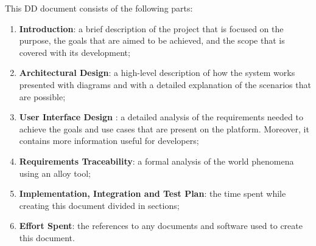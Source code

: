 \renewcommand{\arraystretch}{1.6}
This DD document consists of the following parts:
\begin{enumerate}
    \item \textbf{Introduction}: a brief description of the project that is focused on the purpose, the goals that are aimed to be achieved, and the scope that is covered with its development;
    \item \textbf{Architectural Design}: a high-level description of how the system works presented with diagrams and with a detailed explanation of the scenarios that are possible;
    \item \textbf{User Interface Design }: a detailed analysis of the requirements
    needed to achieve the goals and use cases that are present on the platform. Moreover, it contains more information useful for developers;
    \item \textbf{Requirements Traceability}: a formal analysis of the world phenomena using an alloy tool;
    \item \textbf{ Implementation, Integration and Test Plan}: the time spent while creating this document divided in sections;
    \item \textbf{ Effort Spent}: the references to any documents and software used to create this document.
\end{enumerate}